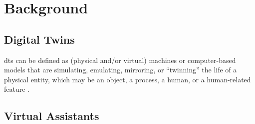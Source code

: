 \chapter{Background}\label{ch:background}

\section{Digital Twins}

\acrfull{dt}s can be defined as (physical and/or virtual) machines or computer-based models that are simulating, emulating, mirroring, or ``twinning'' the life of a physical entity, which may be an object, a process, a human, or a human-related feature \parencite{barricelli_multi-modal_2022}.

\section{Virtual Assistants}